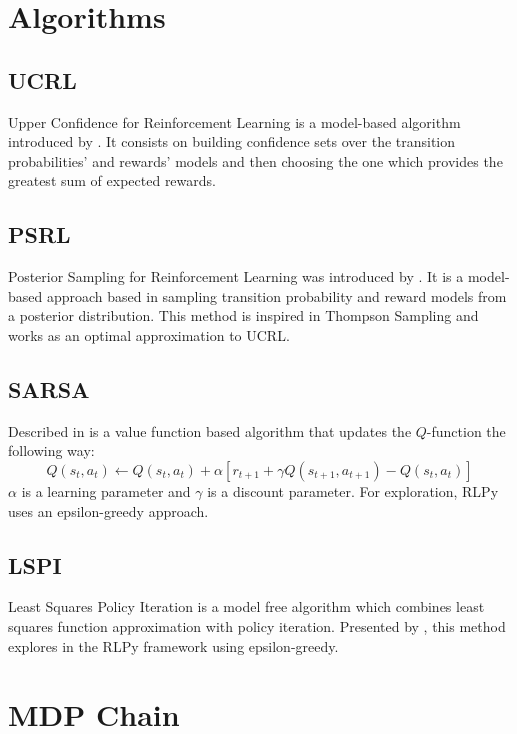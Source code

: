\documentclass[12pt]{article}
\begin{document}
\section{Algorithms}
\label{sec:alg}

\subsection{UCRL}
Upper Confidence for Reinforcement Learning is a model-based algorithm introduced by \cite{UCRL}. It consists on building confidence sets over the transition probabilities' and rewards' models and then choosing the one which provides the greatest sum of expected rewards.
\subsection{PSRL}
Posterior Sampling for Reinforcement Learning was introduced by \cite{PSRL}. It is a model-based approach based in sampling transition probability and reward models from a posterior distribution. This method is inspired in Thompson Sampling and works as an optimal approximation to UCRL. 

\subsection{SARSA}
Described in \cite{Sutton} is a value function based algorithm that updates the $Q$-function the following way: $$Q(s_t,a_t) \leftarrow Q(s_t,a_t) + \alpha [r_{t+1} + \gamma Q(s_{t+1}, a_{t+1})-Q(s_t,a_t)]$$
$\alpha$ is a learning parameter and $\gamma$ is a discount parameter. For exploration, RLPy uses an epsilon-greedy approach.

\subsection{LSPI}
Least Squares Policy Iteration is a model free algorithm which combines least squares function approximation with policy iteration. Presented by \cite{LSPI}, this method explores in the RLPy framework using epsilon-greedy.

\section{MDP Chain}
\label{sec:mdp}
\end{document}
